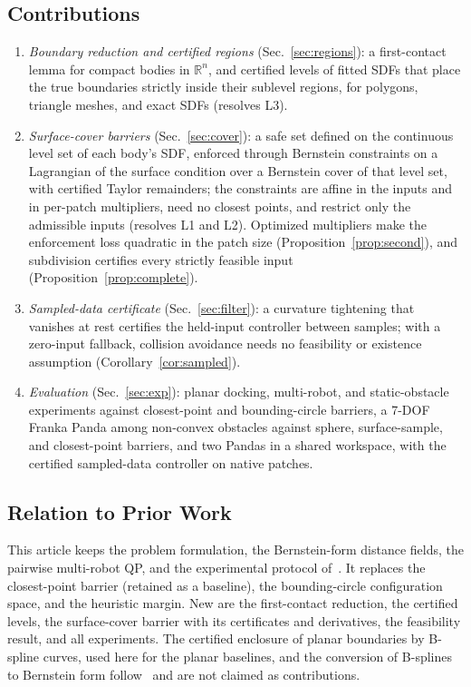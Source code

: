 \documentclass[journal]{IEEEtran}
\theoremstyle{definition}
\newcommand{\R}{\mathbb{R}}
\begin{document}
\subsection{Contributions}
\begin{enumerate}
\item \emph{Boundary reduction and certified regions} (Sec.~\ref{sec:regions}): a first-contact
lemma for compact bodies in $\R^n$, and certified levels of fitted SDFs that place the true
boundaries strictly inside their sublevel regions, for polygons, triangle meshes, and exact SDFs
(resolves L3).
\item \emph{Surface-cover barriers} (Sec.~\ref{sec:cover}): a safe set defined on the continuous level
set of each body's SDF, enforced through Bernstein constraints on a Lagrangian of the surface
condition over a Bernstein cover of that level set, with certified Taylor remainders; the
constraints are affine in the inputs and in per-patch multipliers, need no closest points, and
restrict only the admissible inputs (resolves L1 and L2). Optimized multipliers make the enforcement
loss quadratic in the patch size (Proposition~\ref{prop:second}), and subdivision certifies every
strictly feasible input (Proposition~\ref{prop:complete}).
\item \emph{Sampled-data certificate} (Sec.~\ref{sec:filter}): a curvature tightening that vanishes
at rest certifies the held-input controller between samples; with a zero-input fallback, collision
avoidance needs no feasibility or existence assumption (Corollary~\ref{cor:sampled}).
\item \emph{Evaluation} (Sec.~\ref{sec:exp}): planar docking, multi-robot, and static-obstacle
experiments against closest-point and bounding-circle barriers, a 7-DOF Franka Panda among
non-convex obstacles against sphere, surface-sample, and closest-point barriers, and two Pandas in a
shared workspace, with the certified sampled-data controller on native patches.
\end{enumerate}

\subsection{Relation to Prior Work}\label{sec:relation}
This article keeps the problem formulation, the Bernstein-form distance fields, the pairwise
multi-robot QP, and the experimental protocol of~\cite{jo2026geometry}. It replaces the
closest-point barrier (retained as a baseline), the bounding-circle configuration space, and the
heuristic margin. New are the first-contact reduction, the certified levels, the surface-cover
barrier with its certificates and derivatives, the feasibility result, and all experiments. The
certified enclosure of planar boundaries by B-spline curves, used here for the planar baselines, and
the conversion of B-splines to Bernstein form follow~\cite{jo2027semantic} and are not claimed as
contributions.
\end{document}
